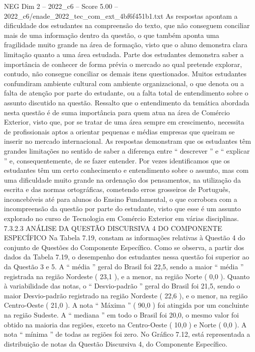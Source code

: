 \begin{textsample}{NEG Dim 2 – 2022\_c6 – Score 5.00 – 2022\_c6/enade\_2022\_tec\_com\_ext\_4bf6f451b1.txt}
As respostas apontam a dificuldade dos estudantes na compreensão do texto, que não conseguem conciliar mais de uma informação dentro da questão, o que também aponta uma fragilidade muito grande na área de formação, visto que o aluno demonstra clara limitação quanto a uma área estudada.
Parte dos estudantes demonstra saber a importância de conhecer de forma prévia o mercado ao qual pretende explorar, contudo, não consegue conciliar os demais itens questionados.
Muitos estudantes confundiram ambiente cultural com ambiente organizacional, o que denota ou a falta de atenção por parte do estudante, ou a falta total de entendimento sobre o assunto discutido na questão.
Ressalto que o entendimento da temática abordada nesta questão é de suma importância para quem atua na área de Comércio Exterior, visto que, por se tratar de uma área sempre em crescimento, necessita de profissionais aptos a orientar pequenas e médias empresas que queiram se inserir no mercado internacional.
As respostas demonstram que os estudantes têm grandes limitações no sentido de saber a diferença entre “ descrever ” e “ explicar ” e, consequentemente, de se fazer entender.
Por vezes identificamos que os estudantes têm um certo conhecimento e entendimento sobre o assunto, mas com uma dificuldade muito grande na ordenação dos pensamentos, na utilização da escrita e das normas ortográficas, cometendo erros grosseiros de Português, inconcebíveis até para alunos do Ensino Fundamental, o que corrobora com a incompreensão da questão por parte do estudante, visto que esse é um assunto explorado no curso de Tecnologia em Comércio Exterior em várias disciplinas. 7.3.2.3 ANÁLISE DA QUESTÃO DISCURSIVA 4 DO COMPONENTE ESPECÍFICO Na Tabela 7.19, constam as informações relativas à Questão 4 do conjunto de Questões do Componente Específico.
Como se observa, a partir dos dados da Tabela 7.19, o desempenho dos estudantes nessa questão foi superior ao da Questão 3 e 5.
A “ média ” geral do Brasil foi 22,5, sendo a maior “ média ” registrada na região Nordeste ( 23,1 ), e a menor, na região Norte ( 0,0 ).
Quanto à variabilidade das notas, o “ Desvio-padrão ” geral do Brasil foi 21,5, sendo o maior Desvio-padrão registrado na região Nordeste ( 22,6 ), e o menor, na região Centro-Oeste ( 21,0 ).
A nota “ Máxima ” ( 90,0 ) foi atingida por um concluinte na região Sudeste.
A “ mediana ” em todo o Brasil foi 20,0, o mesmo valor foi obtido na maioria das regiões, exceto na Centro-Oeste ( 10,0 ) e Norte ( 0,0 ).
A nota “ mínima ” de todas as regiões foi zero.
No Gráfico 7.12, está representada a distribuição de notas da Questão Discursiva 4, do Componente Específico.

\end{textsample}
